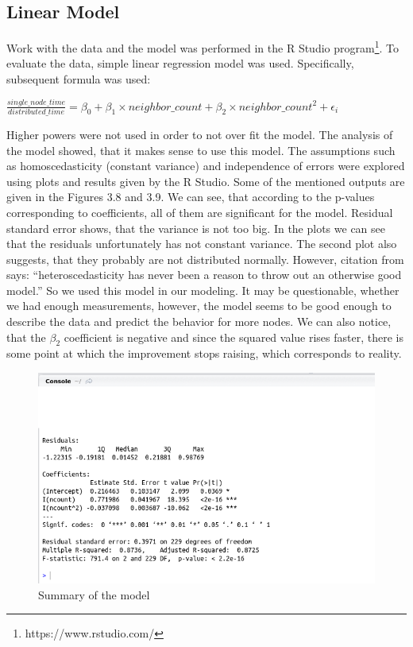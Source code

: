 \pagebreak

\subsection{Linear Model}\label{linear-model}

Work with the data and the model was performed in the R Studio
program\footnote{https://www.rstudio.com/}. To evaluate the data, simple
linear regression model was used. Specifically, subsequent formula was
used:

\begin{center}
$\frac{single\_node\_time}{distributed\_time} = \beta_0 + \beta_1 \times neighbor\_count + \beta_2 \times neighbor\_count^2 + \epsilon_i$
\end{center}

Higher powers were not used in order to not over fit the model. The
analysis of the model showed, that it makes sense to use this model. The
assumptions such as homoscedasticity (constant variance) and
independence of errors were explored using plots and results given by
the R Studio. Some of the mentioned outputs are given in the Figures 3.8
and 3.9. We can see, that according to the p-values corresponding to
coefficients, all of them are significant for the model. Residual
standard error shows, that the variance is not too big. In the plots we
can see that the residuals unfortunately has not constant variance. The
second plot also suggests, that they probably are not distributed
normally. However, citation from \citep{ECON} says: ``heteroscedasticity
has never been a reason to throw out an otherwise good model.'' So we
used this model in our modeling. It may be questionable, whether we had
enough measurements, however, the model seems to be good enough to
describe the data and predict the behavior for more nodes. We can also
notice, that the $\beta_2$ coefficient is negative and since the squared
value rises faster, there is some point at which the improvement stops
raising, which corresponds to reality.

\begin{figure}[h]
\begin{center}
\includegraphics[scale=0.60]{./img/model.png}
\caption{Summary of the model}
\end{center}
\end{figure}

